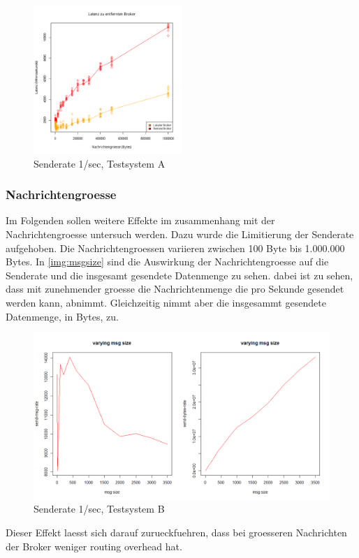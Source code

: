 \begin{figure}
\center
  \includegraphics[width=0.5\textwidth]{images/measurement/rate-limit-1-AvsB.pdf}
  \caption{Senderate 1/sec, Testsystem A}
  \label{img:senderate1-B}
\end{figure}

\subsubsection{Nachrichtengroesse}
Im Folgenden sollen weitere Effekte im zusammenhang mit der Nachrichtengroesse untersuch werden. Dazu wurde die Limitierung der Senderate aufgehoben. Die Nachrichtengroessen variieren zwischen 100 Byte bis 1.000.000 Bytes.
In \autoref{img:msgsize} sind die Auswirkung der Nachrichtengroesse auf die Senderate und die insgesamt gesendete Datenmenge zu sehen. dabei ist zu sehen, dass mit zunehmender groesse die Nachrichtenmenge die pro Sekunde gesendet werden kann, abnimmt. Gleichzeitig nimmt aber die insgesammt gesendete Datenmenge, in Bytes, zu. 
\begin{figure}
\center
  \includegraphics[width=1\textwidth]{images/msg-size.png}
  \caption{Senderate 1/sec, Testsystem B}
  \label{img:msgsize}
\end{figure}
Dieser Effekt laesst sich darauf zurueckfuehren, dass bei groesseren Nachrichten der Broker weniger routing overhead hat.

